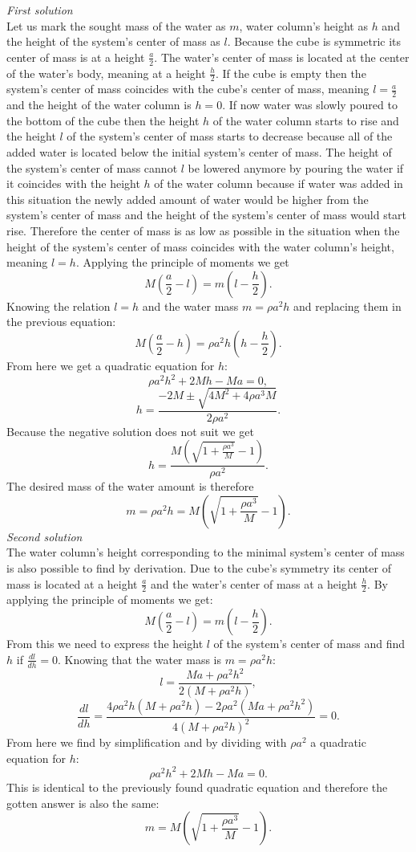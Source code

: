 \documentclass[11pt]{article}
\begin{document}
\solueng
\emph{First solution}\\
Let us mark the sought mass of the water as $m$, water column’s height as $h$ and the height of the system’s center of mass as $l$. Because the cube is symmetric its center of mass is at a height $\frac{a}{2}$. The water’s center of mass is located at the center of the water’s body, meaning at a height $\frac{h}{2}$. If the cube is empty then the system’s center of mass coincides with the cube’s center of mass, meaning $l=\frac{a}{2}$ and the height of the water column is $h=0$. If now water was slowly poured to the bottom of the cube then the height $h$ of the water column starts to rise and the height $l$ of the system’s center of mass starts to decrease because all of the added water is located below the initial system’s center of mass. The height of the system’s center of mass cannot $l$ be lowered anymore by pouring the water if it coincides with the height $h$ of the water column because if water was added in this situation the newly added amount of water would be higher from the system’s center of mass and the height of the system’s center of mass would start rise. Therefore the center of mass is as low as possible in the situation when the height of the system’s center of mass coincides with the water column’s height, meaning $l=h$. Applying the principle of moments we get
$$M(\frac{a}{2}-l)=m(l-\frac{h}{2}).$$
Knowing the relation $l=h$ and the water mass $m=\rho a^2h$ and replacing them in the previous equation:
$$M(\frac{a}{2}-h)=\rho a^2h(h-\frac{h}{2}).$$
From here we get a quadratic equation for $h$:
$$\rho a^2h^2+2Mh-Ma=0,$$
$$h=\frac{-2M \pm \sqrt{4M^2+4\rho a^3M}}{2\rho a^2}.$$
Because the negative solution does not suit we get
$$h=\frac{M(\sqrt{1+\frac{\rho a^3}{M}}-1)}{\rho a^2}.$$
The desired mass of the water amount is therefore
$$m=\rho a^2h=M(\sqrt{1+\frac{\rho a^3}{M}}-1).$$
\emph{Second solution}\\
The water column’s height corresponding to the minimal system’s center of mass is also possible to find by derivation. Due to the cube’s symmetry its center of mass is located at a height $\frac{a}{2}$ and the water’s center of mass at a height $\frac{h}{2}$. By applying the principle of moments we get:
$$M(\frac{a}{2}-l)=m(l-\frac{h}{2}).$$
From this we need to express the height $l$ of the system’s center of mass and find $h$ if $\frac{dl}{dh}=0$. Knowing that the water mass is $m=\rho a^2h$:
$$l=\frac{Ma+\rho a^2h^2}{2(M+\rho a^2h)},$$
$$\frac{dl}{dh}=\frac{4\rho a^2h(M+\rho a^2h)-2\rho a^2(Ma+\rho a^2h^2)}{4(M+\rho a^2h)^2}=0.$$
From here we find by simplification and by dividing with $\rho a^2$ a quadratic equation for $h$:
$$\rho a^2h^2+2Mh-Ma=0.$$
This is identical to the previously found quadratic equation and therefore the gotten answer is also the same:
$$m=M(\sqrt{1+\frac{\rho a^3}{M}}-1).$$
\probend
\bigskip
\end{document}
